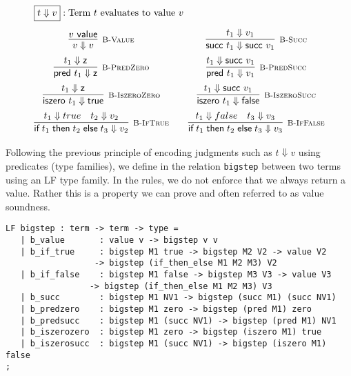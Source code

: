 \[
\begin{array}{c@{\qquad}c}
\multicolumn{2}{l}{\fbox{$t \Downarrow v$}: \mbox{Term $t$ evaluates to value $v$}}\\[1em]
  \infer[\BValue]{v \Downarrow v}{v \Value} &
  \infer[\BSucc]{\tmsucc t_1 \Downarrow \tmsucc v_1}{t_1 \Downarrow v_1} \\[0.5em]
  \infer[\BPredZero]{\tmpred t_1 \Downarrow \tmzero}{t_1 \Downarrow \tmzero} &
  \infer[\BPredSucc]{\tmpred t_1 \Downarrow v_1}{t_1 \Downarrow \tmsucc v_1}
\\[0.5em]
  \infer[\BIszeroZero]{\tmiszero t_1 \Downarrow \tmtrue}{t_1 \Downarrow \tmzero} &
  \infer[\BIszeroSucc]{\tmiszero t_1 \Downarrow \tmfalse}{t_1 \Downarrow \tmsucc v_1} 
\\[0.5em]
  \infer[\BIfTrue]{\tmif {t_1}{t_2}{t_3} \Downarrow v_2}{t_1 \Downarrow true & t_2 \Downarrow v_2} &
  \infer[\BIfFalse]{\tmif {t_1}{t_2}{t_3} \Downarrow v_3}{t_1 \Downarrow false & t_3 \Downarrow v_3} \\

\end{array}
\]

Following the previous principle of encoding judgments such as $t \Downarrow v$
using predicates (type families), we define in \beluga the relation
\lstinline!bigstep! between two terms using an LF type family. In the rules, we do not enforce
that we always return a value. Rather this is a property we can prove
and often referred to as value soundness.

\begin{lstlisting}
LF bigstep : term -> term -> type =
   | b_value       : value v -> bigstep v v
   | b_if_true     : bigstep M1 true -> bigstep M2 V2 -> value V2 
                  -> bigstep (if_then_else M1 M2 M3) V2
   | b_if_false    : bigstep M1 false -> bigstep M3 V3 -> value V3 
                 -> bigstep (if_then_else M1 M2 M3) V3
   | b_succ        : bigstep M1 NV1 -> bigstep (succ M1) (succ NV1)
   | b_predzero    : bigstep M1 zero -> bigstep (pred M1) zero
   | b_predsucc    : bigstep M1 (succ NV1) -> bigstep (pred M1) NV1
   | b_iszerozero  : bigstep M1 zero -> bigstep (iszero M1) true
   | b_iszerosucc  : bigstep M1 (succ NV1) -> bigstep (iszero M1) false
;
\end{lstlisting}


